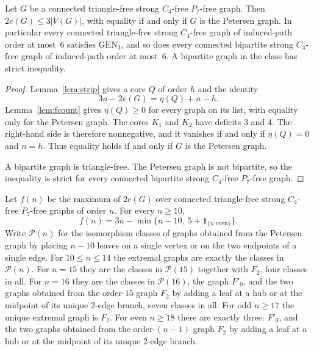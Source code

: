 \documentclass[ASNA]{USG}
\theoremstyle{WBstyletwo}
\numberwithin{equation}{section}
\newcommand{\GEN}{\mathrm{GEN}}
\begin{document}
\begin{theorem}\label{thm:tf}
Let $G$ be a connected triangle-free strong $C_4$-free $P_7$-free graph. Then $2e(G)\le 3|V(G)|$, with equality if and only if $G$ is the Petersen graph. In particular every connected triangle-free strong $C_4$-free graph of induced-path order at most~$6$ satisfies $\GEN_3$, and so does every connected bipartite strong $C_4$-free graph of induced-path order at most~$6$. A bipartite graph in the class has strict inequality.
\end{theorem}

\begin{proof}
Lemma~\ref{lem:strip} gives a core $Q$ of order $h$ and the identity
\[
3n-2e(G)=\eta(Q)+n-h.
\]
Lemma~\ref{lem:fcount} gives $\eta(Q)\ge 0$ for every graph on its list, with equality only for the Petersen graph. The cores $K_1$ and $K_2$ have deficits $3$ and $4$. The right-hand side is therefore nonnegative, and it vanishes if and only if $\eta(Q)=0$ and $n=h$. Thus equality holds if and only if $G$ is the Petersen graph.

A bipartite graph is triangle-free. The Petersen graph is not bipartite, so the inequality is strict for every connected bipartite strong $C_4$-free $P_7$-free graph.
\end{proof}

\begin{theorem}\label{thm:fn}
Let $f(n)$ be the maximum of $2e(G)$ over connected triangle-free strong $C_4$-free $P_7$-free graphs of order $n$. For every $n\ge 10$,
\[
f(n)=3n-\min\bigl\{n-10,\ 5+\mathbf{1}_{\{n\text{ even}\}}\bigr\}.
\]
Write $\mathcal P(n)$ for the isomorphism classes of graphs obtained from the Petersen graph by placing $n-10$ leaves on a single vertex or on the two endpoints of a single edge. For $10\le n\le 14$ the extremal graphs are exactly the classes in $\mathcal P(n)$. For $n=15$ they are the classes in $\mathcal P(15)$ together with $F_2$, four classes in all. For $n=16$ they are the classes in $\mathcal P(16)$, the graph $F'_0$, and the two graphs obtained from the order-$15$ graph $F_2$ by adding a leaf at a hub or at the midpoint of its unique $2$-edge branch, seven classes in all. For odd $n\ge 17$ the unique extremal graph is $F_2$. For even $n\ge 18$ there are exactly three: $F'_0$, and the two graphs obtained from the order-$(n-1)$ graph $F_2$ by adding a leaf at a hub or at the midpoint of its unique $2$-edge branch.
\end{theorem}
\end{document}
